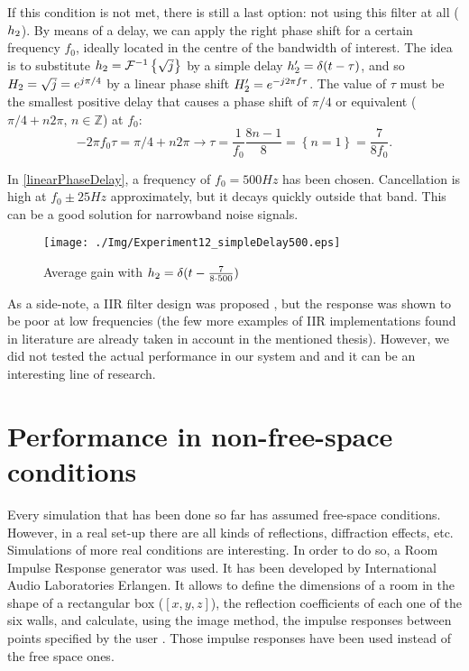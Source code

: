 If this condition is not met, there is still a last option: not using this filter at all ($\freqFilter[time][phase]$). By means of a delay, we can apply the right phase shift for a certain frequency $f_0$, ideally located in the centre of the bandwidth of interest. The idea is to substitute $\freqFilter[time][phase] = \FourierTransform{\sqrt{j}}[inverse]$ by a simple delay $\freqFilter[time][phase]' = \delta(t - \tau)$, and so $\freqFilter[frequency][phase] = \sqrt{j} = e^{j\pi/4}$ by a linear phase shift $\freqFilter[frequency][phase]' = e^{-j2\pi f \tau}$. The value of $\tau$ must be the smallest positive delay that causes a phase shift of $\pi/4$ or equivalent ($\pi/4 + n2\pi$, $n \in \mathbb{Z}$) at $f_0$:
\begin{equation}
	-2\pi f_0 \tau = \pi/4 + n2\pi \rightarrow \tau = \frac{1}{f_0}\frac{8n - 1}{8} = \left\{n = 1\right\} = \frac{7}{8f_0}.
\end{equation}

In \autoref{linearPhaseDelay}, a frequency of $f_0 = 500\si{Hz}$ has been chosen. Cancellation is high at $f_0 \pm 25 \si{Hz}$ approximately, but it decays quickly outside that band. This can be a good solution for narrowband noise signals.

\begin{figure}
	\centering
	\texttt{[image: ./Img/Experiment12\_simpleDelay500.eps]}
	\caption[Average gain with frequency linear phase shift filter]{Average gain with $\freqFilter[time][phase] = \delta(t - \frac{7}{8\cdot 500})$}
	\label{linearPhaseDelay}
\end{figure}

As a side-note, a IIR filter design was proposed \cite{FrankSchutz2015}, but the response was shown to be poor at low frequencies (the few more examples of IIR implementations found in literature are already taken in account in the mentioned thesis). However, we did not tested the actual performance in our system and and it can be an interesting line of research.

\section{Performance in non-free-space conditions}
Every simulation that has been done so far has assumed free-space conditions. However, in a real set-up there are all kinds of reflections, diffraction effects, etc. Simulations of more real conditions are interesting. In order to do so, a Room Impulse Response generator was used. It has been developed by International Audio Laboratories Erlangen. It allows to define the dimensions of a room in the shape of a rectangular box ($[x,y,z]$), the reflection coefficients of each one of the six walls, and calculate, using the image method, the impulse responses between points specified by the user \cite{RIRgenerator2}. Those impulse responses have been used instead of the free space ones.

